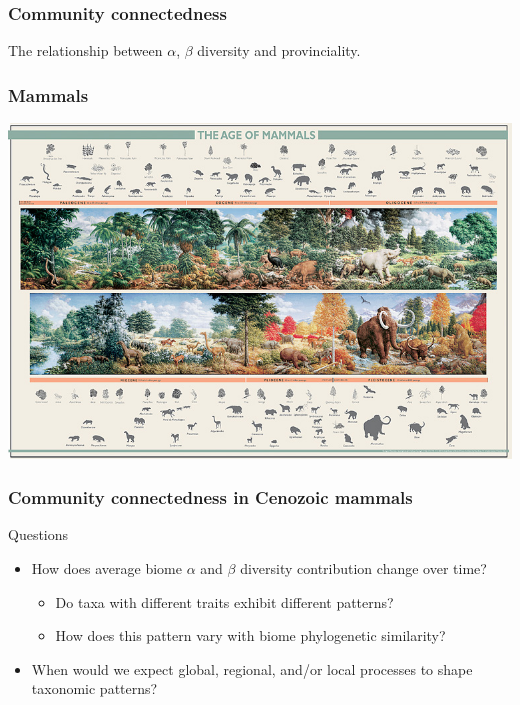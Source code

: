 \documentclass{beamer}
\begin{document}
\begin{frame}
  \frametitle{Community connectedness}
  \begin{definition}
    The relationship between \(\alpha\), \(\beta\) diversity and provinciality.
  \end{definition}
\end{frame}

\begin{frame}
  \frametitle{Mammals}
  \includegraphics[height = 0.9\textheight, width = \textwidth, keepaspectratio = true]{figure/aom}

  \tiny{}
\end{frame}

\begin{frame}
  \frametitle{Community connectedness in Cenozoic mammals}

  \begin{block}{Questions}
    \begin{itemize}
      \item How does average biome \(\alpha\) and \(\beta\) diversity contribution change over time?
        \begin{itemize}
          \item Do taxa with different traits exhibit different patterns?
          \item How does this pattern vary with biome phylogenetic similarity? 
        \end{itemize}
      \item When would we expect global, regional, and/or local processes to shape taxonomic patterns?
    \end{itemize}
  \end{block}
\end{frame}
\end{document}
